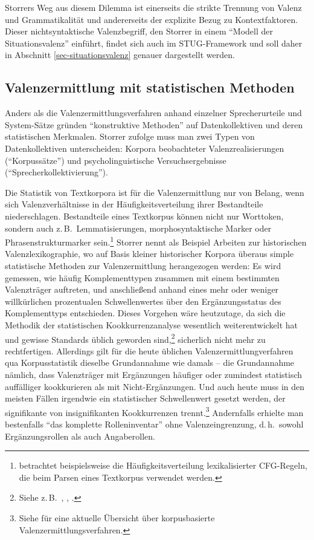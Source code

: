 Storrers Weg aus diesem Dilemma ist einerseits die strikte Trennung von Valenz und Grammatikalität und andererseits der explizite Bezug zu Kontextfaktoren. Dieser nichtsyntaktische Valenzbegriff, den Storrer in einem "`Modell der Situationsvalenz"' einführt, findet sich auch im STUG-Framework und soll daher in Abschnitt \ref{sec-situationsvalenz} genauer dargestellt werden. 



\subsection{Valenzermittlung mit statistischen Methoden} \label{sec-valenzermittlung-konstruktiv}

Anders als die Valenzermittlungsverfahren anhand einzelner Sprecherurteile und System-Sät\-ze gründen "`konstruktive Methoden"' \citep[228ff]{Storrer:92} auf Datenkollektiven und deren statistischen Merkmalen. Storrer zufolge muss man zwei Typen von Datenkollektiven unterscheiden: Korpora beobachteter Valenzrealisierungen ("`Korpussätze"') und psycholinguistische Versuchsergebnisse ("`Sprecherkollektivierung"'). 
 
Die Statistik von Textkorpora ist für die Valenzermittlung nur von Belang, wenn sich Valenzverhältnisse in der Häufigkeitsverteilung ihrer Bestandteile niederschlagen. Bestandteile eines Textkorpus können nicht nur Worttoken, sondern auch z.\,B.\ Lemmatisierungen, morphosyntaktische Marker oder Phrasenstrukturmarker sein.\footnote{\cite{SchulteImWalde:02} betrachtet beispielsweise die Häufigkeitsverteilung lexikalisierter CFG-Regeln, die beim Parsen eines Textkorpus verwendet werden.} Storrer nennt als Beispiel Arbeiten zur historischen Valenzlexikographie, wo auf Basis kleiner historischer Korpora überaus simple statistische Methoden zur Valenzermittlung herangezogen werden: Es wird gemessen, wie häufig Komplementtypen zusammen mit einem bestimmten Valenzträger auftreten, und anschlie\ss end anhand eines mehr oder weniger willkürlichen prozentualen Schwellenwertes über den Ergänzungsstatus des Komplementtyps entschieden. Dieses Vorgehen wäre heutzutage, da sich die Methodik der statistischen Kookkurrenzanalyse wesentlich weiterentwickelt hat und gewisse Standards üblich geworden sind,\footnote{Siehe z.\,B.\ \cite{Lemnitzer:97}, \cite{Krenn:99}, \cite{Evert:05}.} sicherlich nicht mehr zu rechtfertigen. Allerdings gilt für die heute üblichen Valenzermittlungverfahren qua Korpusstatistik dieselbe Grundannahme wie damals -- die Grundannahme nämlich, dass Valenzträger mit Ergänzungen häufiger oder zumindest statistisch auffälliger kookkurieren als mit Nicht-Ergänzungen. Und auch heute muss in den meisten Fällen irgendwie ein statistischer Schwellenwert gesetzt werden, der signifikante von insignifikanten Kookkurrenzen trennt.\footnote{Siehe \cite{SchulteImWalde:09} für eine aktuelle Übersicht über korpusbasierte Valenzermittlungsverfahren.} Andernfalls erhielte man bestenfalls "`das komplette Rolleninventar"' \citep[232]{Storrer:92} ohne Valenzeingrenzung, d.\,h.\ sowohl Ergänzungsrollen als auch Angaberollen.


